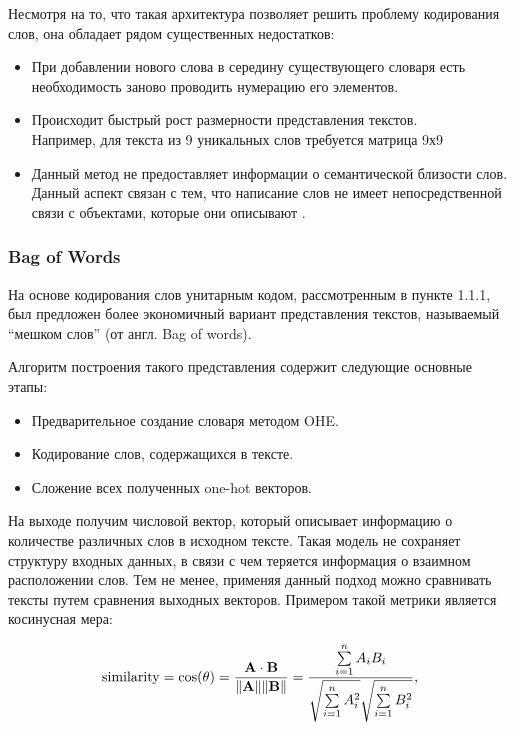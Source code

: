 Несмотря на то, что такая архитектура позволяет решить проблему кодирования слов, она обладает рядом существенных недостатков:
\begin{itemize}
  \item При добавлении нового слова в середину существующего словаря есть необходимость заново проводить нумерацию его элементов.
  \item Происходит быстрый рост размерности представления текстов. \\ Например, для текста из 9 уникальных слов требуется матрица 9х9
 \item Данный метод не предоставляет информации о семантической близости слов. Данный аспект связан с тем, что написание слов не имеет непосредственной связи с объектами, которые они описывают \autocite{saussure1916course}.
\end{itemize}

\subsubsection{Bag of Words}

На основе кодирования слов унитарным кодом, рассмотренным в пункте 1.1.1, был предложен более экономичный вариант представления текстов, называемый “мешком слов” (от англ. Bag of words).

Алгоритм построения такого представления содержит следующие основные этапы:
\begin{itemize}
  \item Предварительное создание словаря методом OHE.
  \item Кодирование слов, содержащихся в тексте.
 \item Сложение всех полученных one-hot векторов.
\end{itemize}

На выходе получим числовой вектор, который описывает информацию о количестве различных слов в исходном тексте.
Такая модель не сохраняет структуру входных данных, в связи с чем теряется информация о взаимном расположении слов.
Тем не менее, применяя данный подход можно сравнивать тексты путем сравнения выходных векторов. Примером такой метрики является косинусная мера:

\begin{equation}\label{eq:cos}
{\displaystyle {\text{similarity}}=\cos(\theta )={\mathbf {A} \cdot \mathbf {B}  \over \|\mathbf {A} \|\|\mathbf {B} \|}={\frac {\sum \limits _{i=1}^{n}{A_{i}B_{i}}}{{\sqrt {\sum \limits _{i=1}^{n}{A_{i}^{2}}}}{\sqrt {\sum \limits _{i=1}^{n}{B_{i}^{2}}}}}},}
\end{equation}

